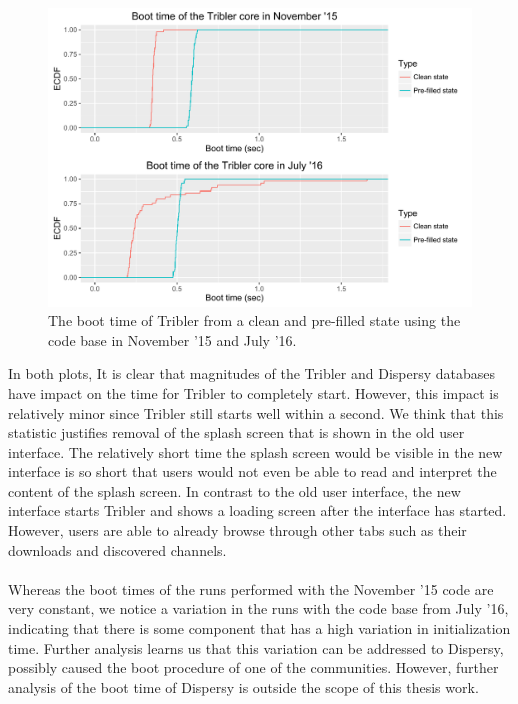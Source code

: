 \begin{figure}[!h]
	\centering
	\includegraphics[width=1.0\columnwidth]{images/experiments/startup}
	\caption{The boot time of Tribler from a clean and pre-filled state using the code base in November '15 and July '16.}
	\label{fig:startup_experiment}
\end{figure}

In both plots, It is clear that magnitudes of the Tribler and Dispersy databases have impact on the time for Tribler to completely start. However, this impact is relatively minor since Tribler still starts well within a second. We think that this statistic justifies removal of the splash screen that is shown in the old user interface. The relatively short time the splash screen would be visible in the new interface is so short that users would not even be able to read and interpret the content of the splash screen. In contrast to the old user interface, the new interface starts Tribler and shows a loading screen after the interface has started. However, users are able to already browse through other tabs such as their downloads and discovered channels.\\\\
Whereas the boot times of the runs performed with the November '15 code are very constant, we notice a variation in the runs with the code base from July '16, indicating that there is some component that has a high variation in initialization time. Further analysis learns us that this variation can be addressed to Dispersy, possibly caused the boot procedure of one of the communities. However, further analysis of the boot time of Dispersy is outside the scope of this thesis work.

